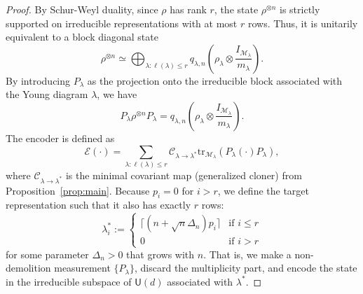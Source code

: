 \documentclass[11pt,letterpaper]{article}
\def\tr{\mathrm{tr}}
\def\map{\mathcal}
\begin{document}
\begin{proof}
By Schur-Weyl duality, since $\rho$ has rank $r$, the state $\rho^{\otimes n}$ is strictly supported on irreducible representations with at most $r$ rows. Thus, it is unitarily equivalent to a block diagonal state
\begin{equation}
    \rho^{\otimes n}\simeq\bigoplus_{\lambda : \ell(\lambda) \le r} q_{\lambda,n}\left(\rho_\lambda\otimes\frac{I_{\map{M}_\lambda}}{m_\lambda}\right).
\end{equation}
By introducing $P_\lambda$ as the projection onto the irreducible block associated with the Young diagram $\lambda$, we have
\begin{equation}
    P_\lambda\rho^{\otimes n}P_\lambda = q_{\lambda,n}\left(\rho_\lambda\otimes\frac{I_{\map{M}_\lambda}}{m_\lambda}\right).
\end{equation}
The encoder is defined as
\begin{equation}
    \map{E}(\cdot) = \sum_{\lambda : \ell(\lambda) \le r}\map{C}_{\lambda\to \lambda^*}\tr_{\map{M}_{\lambda}}(P_\lambda(\cdot)P_\lambda),
\end{equation}
where $\map{C}_{\lambda\to\lambda^*}$ is the minimal covariant map (generalized cloner) from Proposition~\ref{prop:main}. Because $p_i = 0$ for $i > r$, we define the target representation such that it also has exactly $r$ rows:
\begin{equation}
    \lambda^*_i := \begin{cases} 
      \lceil(n+\sqrt{n}\Delta_n)p_i\rceil & \text{if } i \le r \\
      0 & \text{if } i > r 
   \end{cases}
\end{equation}
for some parameter $\Delta_n>0$ that grows with $n$. That is, we make a non-demolition measurement $\{P_\lambda\}$, discard the multiplicity part, and encode the state in the irreducible subspace of $\mathsf{U}(d)$ associated with $\lambda^*$. 


\end{proof}
\end{document}
